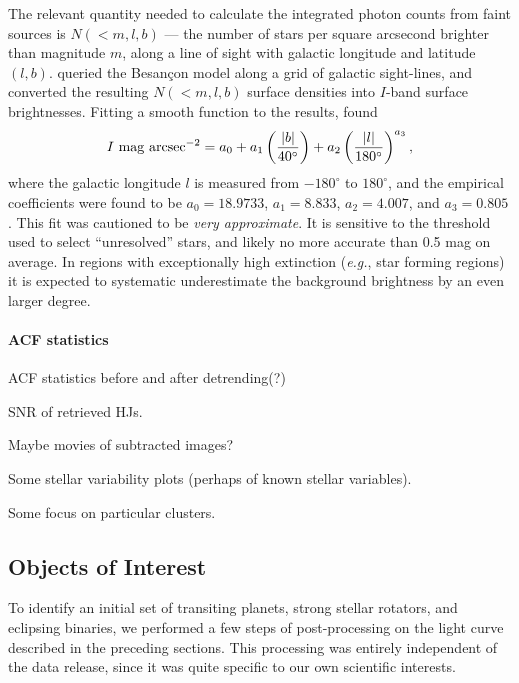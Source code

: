 \documentclass[12pt,twocolumn,tighten]{aastex62}
\begin{document}
The relevant quantity needed to calculate the integrated 
photon counts from faint sources
is  $N(<m,l,b)$ --- the number of stars per square arcsecond
brighter than magnitude $m$, along a line of sight with galactic
longitude and latitude $(l,b)$.
\citet{winn_background_2013} queried the Besan\c con model 
\citep{robin_synthetic_2003}  along a grid of galactic sight-lines, and 
converted the resulting $N(<m,l,b)$ surface densities into $I$-band surface 
brightnesses.
Fitting a smooth function to the results, \citet{winn_background_2013} found
\begin{equation}
I\ {\rm mag\ arcsec}^{-2} =
    a_0 + a_1 \left(\frac{|b|}{40^\circ}\right)
    + a_2 \left(\frac{|l|}{180^\circ}\right)^{a_3},
\end{equation}
where the galactic longitude $l$ is measured from $-180^\circ$ to 
$180^\circ$, and the empirical coefficients were found to be $a_0 = 18.9733$, 
$a_1=8.833$, $a_2=4.007$, and $a_3=0.805$.
This fit was cautioned to be {\it very approximate}.
It is sensitive to the threshold used to select ``unresolved'' stars, and 
likely no more accurate than 0.5 mag on average.
In regions with exceptionally high extinction ({\it e.g.}, star forming 
regions) it is expected to systematic underestimate the background brightness 
by an even larger degree.


\paragraph{ACF statistics}
ACF statistics before and after detrending(?)

SNR of retrieved HJs.

Maybe movies of subtracted images?

Some stellar variability plots (perhaps of known stellar variables).

Some focus on particular clusters.

\subsection{Objects of Interest}
\label{subsec:ctois}

To identify an initial set of transiting planets, strong stellar rotators, and 
eclipsing binaries, we performed a few steps of post-processing on the light 
curve described in the preceding sections. 
This processing was entirely independent of the data release, since it was 
quite specific to our own scientific interests.
\end{document}
